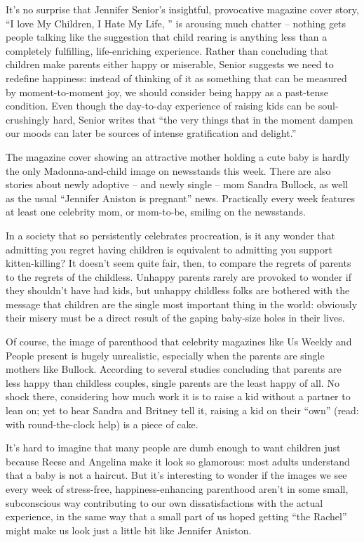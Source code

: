 It's no surprise that Jennifer Senior's insightful, provocative magazine cover story, ``I love My Children, I Hate My Life, '' is arousing much chatter – nothing gets people talking like the suggestion that child rearing is anything less than a completely fulfilling, life-enriching experience. Rather than concluding that children make parents either happy or miserable, Senior suggests we need to redefine happiness: instead of thinking of it as something that can be measured by moment-to-moment joy, we should consider being happy as a past-tense condition. Even though the day-to-day experience of raising kids can be soul-crushingly hard, Senior writes that ``the very things that in the moment dampen our moods can later be sources of intense gratification and delight.''


The magazine cover showing an attractive mother holding a cute baby is hardly the only Madonna-and-child image on newsstands this week. There are also stories about newly adoptive – and newly single – mom Sandra Bullock, as well as the usual ``Jennifer Aniston is pregnant'' news. Practically every week features at least one celebrity mom, or mom-to-be, smiling on the newsstands.


In a society that so persistently celebrates procreation, is it any wonder that admitting you regret having children is equivalent to admitting you support kitten-killing? It doesn't seem quite fair, then, to compare the regrets of parents to the regrets of the childless. Unhappy parents rarely are provoked to wonder if they shouldn't have had kids, but unhappy childless folks are bothered with the message that children are the single most important thing in the world: obviously their misery must be a direct result of the gaping baby-size holes in their lives.


Of course, the image of parenthood that celebrity magazines like Us Weekly and People present is hugely unrealistic, especially when the parents are single mothers like Bullock. According to several studies concluding that parents are less happy than childless couples, single parents are the least happy of all. No shock there, considering how much work it is to raise a kid without a partner to lean on; yet to hear Sandra and Britney tell it, raising a kid on their ``own'' (read: with round-the-clock help) is a piece of cake.


It's hard to imagine that many people are dumb enough to want children just because Reese and Angelina make it look so glamorous: most adults understand that a baby is not a haircut. But it's interesting to wonder if the images we see every week of stress-free, happiness-enhancing parenthood aren't in some small, subconscious way contributing to our own dissatisfactions with the actual experience, in the same way that a small part of us hoped getting ``the Rachel'' might make us look just a little bit like Jennifer Aniston.